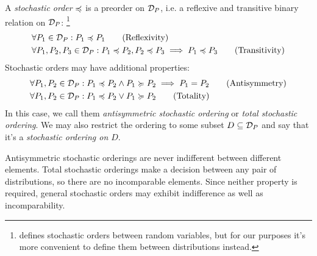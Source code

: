 \documentclass[a4paper]{scrreprt}
\begin{document}
    \begin{defn}[Stochastic Order]
        A \emph{stochastic order} $\preccurlyeq$ is a preorder on $\mathcal{D}_P$, i.e. a reflexive and transitive binary relation on $\mathcal{D}_P$:
        \footnote{\cite{bib:shakedStochasticOrders} defines stochastic orders between random variables, but for our purposes it's more convenient to define them between distributions instead.}
        \begin{align*}
            &\forall P_1 \in \mathcal{D}_P: P_1 \preccurlyeq P_1 \tag{Reflexivity} \\
            &\forall P_1, P_2, P_3 \in \mathcal{D}_P: P_1 \preccurlyeq P_2, P_2 \preccurlyeq P_3 \implies P_1 \preccurlyeq P_3 \tag{Transitivity}
        \end{align*}
        Stochastic orders may have additional properties:
        \begin{align*}
            &\forall P_1, P_2 \in \mathcal{D}_P: P_1 \preccurlyeq P_2 \wedge P_1 \succcurlyeq P_2 \implies P_1 = P_2 \tag{Antisymmetry} \\
            &\forall P_1, P_2 \in \mathcal{D}_P: P_1 \preccurlyeq P_2 \vee P_1 \succcurlyeq P_2 \tag{Totality}
        \end{align*}
        In this case, we call them \emph{antisymmetric stochastic ordering} or \emph{total stochastic ordering}.
        We may also restrict the ordering to some subset $D \subseteq \mathcal{D}_P$ and say that it's a \emph{stochastic ordering on $D$}.
    \end{defn}
    Antisymmetric stochastic orderings are never indifferent between different elements. Total stochastic orderings make a decision between any pair of distributions, so there are no incomparable elements. Since neither property is required, general stochastic orders may exhibit indifference as well as incomparability.
    
\end{document}
